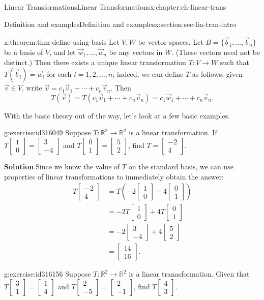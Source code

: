 \documentclass[oneside,10pt,]{book}
\numberwithin{equation}{section}
\newcommand{\bbm}{\begin{bmatrix}}
\newcommand{\ebm}{\end{bmatrix}}
\newcommand{\R}{\mathbb{R}}
\newcommand{\amp}{&}
\begin{document}
\begin{chapterptx}{Linear Transformations}{}{Linear Transformations}{}{}{x:chapter:ch-linear-trans}
\begin{sectionptx}{Definition and examples}{}{Definition and examples}{}{}{x:section:sec-lin-tran-intro}
\begin{theorem}{}{}{x:theorem:thm-define-using-basis}%
Let \(V,W\) be vector spaces. Let \(B=\{\vec{b}_1,\ldots, \vec{b}_n\}\) be a basis of \(V\), and let \(\vec{w}_1,\ldots, \vec{w}_n\) be any vectors in \(W\). (These vectors need not be distinct.) Then there exists a unique linear transformation \(T:V\to W\) such that \(T(\vec{b}_i)=\vec{w}_i\) for each \(i=1,2,\ldots, n\); indeed, we can define \(T\) as follows: given \(\vec{v}\in V\), write \(\vec{v}=c_1\vec{v}_1+\cdots +c_n\vec{v}_n\). Then%
\begin{equation*}
T(\vec{v})=T(c_1\vec{v}_1+\cdots + c_n\vec{v}_n) = c_1\vec{w}_1+\cdots +c_n\vec{v}_n\text{.}
\end{equation*}
%
\end{theorem}
With the basic theory out of the way, let's look at a few basic examples.%
\begin{inlineexercise}{}{g:exercise:id316049}%
Suppose \(T:\R^2\to \R^2\) is a linear transformation. If \(T\bbm 1\\0\ebm = \bbm 3\\-4\ebm\) and \(T\bbm 0\\1\ebm =\bbm 5\\2\ebm\), find \(T=\bbm -2\\4\ebm\).%
\par\smallskip%
\noindent\textbf{Solution}.\hypertarget{g:solution:id316092}{}\quad{}Since we know the value of \(T\) on the standard basis, we can use properties of linear transformations to immediately obtain the answer:%
\begin{align*}
T\bbm -2\\4\ebm \amp= T\left(-2\bbm 1\\0\ebm +4\bbm 0\\1\ebm\right)\\
\amp = -2T\bbm 1\\0\ebm+4T\bbm 0\\1\ebm\\
\amp = -2\bbm 3\\-4\ebm +4\bbm 5\\2\ebm\\
\amp = \bbm 14\\16\ebm\text{.}
\end{align*}
%
\end{inlineexercise}
\begin{inlineexercise}{}{g:exercise:id316156}%
Suppose \(T:\R^2\to \R^2\) is a linear tranasformation. Given that \(T\bbm 3\\1\ebm = \bbm 1\\4\ebm\) and \(T\bbm 2\\-5\ebm = \bbm 2\\-1\ebm\), find \(T\bbm 4\\3\ebm\).%

\end{inlineexercise}
\end{sectionptx}
\end{chapterptx}
\end{document}
